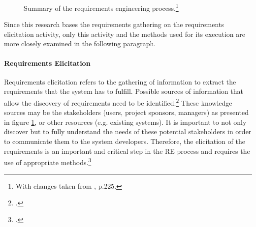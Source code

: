 \captionsetup{list=no}
\begin{figure}
    \centering
    
    \caption[Summary of the requirements engineering process.]{Summary of the requirements engineering process.\footnote{With changes taken from \cite{ZhangEffectiverequirementsdevelopmentA2007}, p.225.}}
    \label{fig:REAll}
\end{figure}
Since this research bases the requirements gathering on the requirements elicitation activity, only this activity and the methods used for its execution are more closely examined in the following paragraph. 

\paragraph{Requirements Elicitation} Requirements elicitation refers to the gathering of information to extract the requirements that the system has to fulfill. Possible sources of information that allow the discovery of requirements need to be identified.\footcites[Cf.][p.2]{TiwariMethodologySelectionRequirement2017}[cf.][p.17]{SommervilleIntegratedrequirementsengineering2005} These knowledge sources may be the stakeholders (users, project sponsors, managers) as presented in figure \ref{fig:REAll}, or other resources (e.g. existing systems). It is important to not only discover but to fully understand the needs of these potential stakeholders in order to communicate them to the system developers. Therefore, the elicitation of the requirements is an important and critical step in the RE process and requires the use of appropriate methods.\footcites[Cf.][p.232]{ZhangEffectiverequirementsdevelopmentA2007}[cf.][pp.19 et seq]{ZowghiRequirementselicitationsurvey2005}

